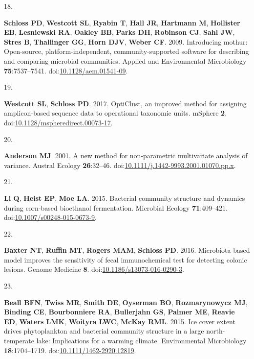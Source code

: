\documentclass[
]{article}
\newlength{\cslhangindent}
\newlength{\csllabelwidth}
\newlength{\cslentryspacingunit} %
\newenvironment{CSLReferences}[2] %
 {%
  \setlength{\parindent}{0pt}
  \ifodd #1
  \let\oldpar\par
  \def\par{\hangindent=\cslhangindent\oldpar}
  \fi
  \setlength{\parskip}{#2\cslentryspacingunit}
 }%
 {}
\newcommand{\CSLLeftMargin}[1]{\parbox[t]{\csllabelwidth}{#1}}
\newcommand{\CSLRightInline}[1]{\parbox[t]{\linewidth - \csllabelwidth}{#1}\break}
\begin{document}
\begin{CSLReferences}{0}{1}
\leavevmode{}%
\CSLLeftMargin{18. }%
\CSLRightInline{\textbf{Schloss PD}, \textbf{Westcott SL},
\textbf{Ryabin T}, \textbf{Hall JR}, \textbf{Hartmann M},
\textbf{Hollister EB}, \textbf{Lesniewski RA}, \textbf{Oakley BB},
\textbf{Parks DH}, \textbf{Robinson CJ}, \textbf{Sahl JW}, \textbf{Stres
B}, \textbf{Thallinger GG}, \textbf{Horn DJV}, \textbf{Weber CF}. 2009.
Introducing mothur: Open-source, platform-independent,
community-supported software for describing and comparing microbial
communities. Applied and Environmental Microbiology
\textbf{75}:7537--7541.
doi:\href{https://doi.org/10.1128/aem.01541-09}{10.1128/aem.01541-09}.}

\leavevmode{}%
\CSLLeftMargin{19. }%
\CSLRightInline{\textbf{Westcott SL}, \textbf{Schloss PD}. 2017.
{OptiClust}, an improved method for assigning amplicon-based sequence
data to operational taxonomic units. {mSphere} \textbf{2}.
doi:\href{https://doi.org/10.1128/mspheredirect.00073-17}{10.1128/mspheredirect.00073-17}.}

\leavevmode{}%
\CSLLeftMargin{20. }%
\CSLRightInline{\textbf{Anderson MJ}. 2001. A new method for
non-parametric multivariate analysis of variance. Austral Ecology
\textbf{26}:32--46.
doi:\href{https://doi.org/10.1111/j.1442-9993.2001.01070.pp.x}{10.1111/j.1442-9993.2001.01070.pp.x}.}

\leavevmode{}%
\CSLLeftMargin{21. }%
\CSLRightInline{\textbf{Li Q}, \textbf{Heist EP}, \textbf{Moe LA}. 2015.
Bacterial community structure and dynamics during corn-based bioethanol
fermentation. Microbial Ecology \textbf{71}:409--421.
doi:\href{https://doi.org/10.1007/s00248-015-0673-9}{10.1007/s00248-015-0673-9}.}

\leavevmode{}%
\CSLLeftMargin{22. }%
\CSLRightInline{\textbf{Baxter NT}, \textbf{Ruffin MT}, \textbf{Rogers
MAM}, \textbf{Schloss PD}. 2016. Microbiota-based model improves the
sensitivity of fecal immunochemical test for detecting colonic lesions.
Genome Medicine \textbf{8}.
doi:\href{https://doi.org/10.1186/s13073-016-0290-3}{10.1186/s13073-016-0290-3}.}

\leavevmode{}%
\CSLLeftMargin{23. }%
\CSLRightInline{\textbf{Beall BFN}, \textbf{Twiss MR}, \textbf{Smith
DE}, \textbf{Oyserman BO}, \textbf{Rozmarynowycz MJ}, \textbf{Binding
CE}, \textbf{Bourbonniere RA}, \textbf{Bullerjahn GS}, \textbf{Palmer
ME}, \textbf{Reavie ED}, \textbf{Waters LMK}, \textbf{Woityra LWC},
\textbf{McKay RML}. 2015. Ice cover extent drives phytoplankton and
bacterial community structure in a large north-temperate lake:
Implications for a warming climate. Environmental Microbiology
\textbf{18}:1704--1719.
doi:\href{https://doi.org/10.1111/1462-2920.12819}{10.1111/1462-2920.12819}.}


\end{CSLReferences}
\end{document}
